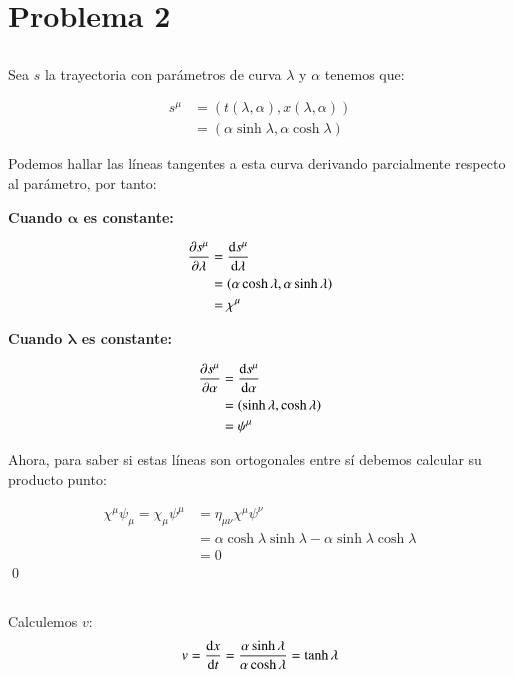 \section{Problema 2}
\subsection{}

Sea $s$ la trayectoria con parámetros de curva $\lambda$ y $\alpha$ tenemos que:

\begin{align*}
    s^{\mu}&=\left(t(\lambda,\alpha),x(\lambda,\alpha)\right)\\
    &= \left(\alpha\sinh\lambda,\alpha\cosh\lambda\right)
\end{align*}

Podemos hallar las líneas tangentes a esta curva derivando parcialmente respecto al parámetro, por tanto:

\textbf{Cuando $\mathbf{\alpha}$ es constante:}

\begin{align*}
    \pdv{s^\mu}{\lambda}&=\dv{s^\mu}{\lambda}\\
    &= \left(\alpha \cosh\lambda,\alpha\sinh\lambda\right)\\
    &= \chi^\mu
\end{align*}

\textbf{Cuando $\mathbf{\lambda}$ es constante:}

\begin{align*}
    \pdv{s^\mu}{\alpha}&=\dv{s^\mu}{\alpha}\\
    &=\left(\sinh\lambda,\cosh\lambda\right)\\
    &=\psi^\mu
\end{align*}

Ahora, para saber si estas líneas son ortogonales entre sí debemos calcular su producto punto:

\begin{align*}
    \chi^\mu\psi_\mu=\chi_\mu\psi^\mu&=\eta_{\mu\nu}\chi^\mu\psi^\nu\\
    &=\alpha\cosh\lambda\sinh\lambda-\alpha\sinh\lambda\cosh\lambda\\
    &=0
\end{align*}
\qed

\subsection{}

Calculemos $v$:
\begin{align*}
    v = \dv{x}{t}=\frac{\alpha\sinh\lambda}{\alpha\cosh\lambda}=\tanh\lambda
\end{align*}

